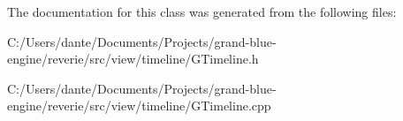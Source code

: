 The documentation for this class was generated from the following files\+:\begin{DoxyCompactItemize}
\item 
C\+:/\+Users/dante/\+Documents/\+Projects/grand-\/blue-\/engine/reverie/src/view/timeline/G\+Timeline.\+h\item 
C\+:/\+Users/dante/\+Documents/\+Projects/grand-\/blue-\/engine/reverie/src/view/timeline/G\+Timeline.\+cpp\end{DoxyCompactItemize}
